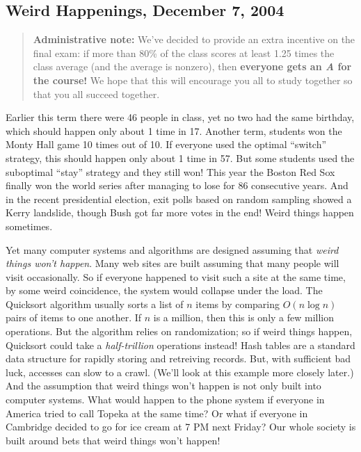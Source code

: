 \begin{editingnotes}

\section*{Weird Happenings, December 7, 2004}

\begin{quotation}
\noindent \textbf{Administrative note:} We've decided to provide an
extra incentive on the final exam: if more than 80\% of the class
scores at least 1.25 times the class average (and the average is
nonzero), then \textbf{everyone gets an \textit{A} for the course!}
We hope that this will encourage you all to study together so that you
all succeed together.
\end{quotation}


Earlier this term there were 46 people in class, yet no two had the
same birthday, which should happen only about 1 time in 17.  Another
term, students won the Monty Hall game 10 times out of 10.  If
everyone used the optimal ``switch'' strategy, this should happen only
about 1 time in 57.  But some students used the suboptimal ``stay''
strategy and they still won!  This year the Boston Red Sox finally won
the world series after managing to lose for 86 consecutive years.  And
in the recent presidential election, exit polls based on random
sampling showed a Kerry landslide, though Bush got far more votes in
the end!  Weird things happen sometimes.

Yet many computer systems and algorithms are designed assuming that
\textit{weird things won't happen}.  Many web sites are built assuming
that many people will visit occasionally.  So if everyone happened to
visit such a site at the same time, by some weird coincidence, the
system would collapse under the load.  The Quicksort algorithm usually
sorts a list of $n$ items by comparing $O(n \log n)$ pairs of items to
one another.  If $n$ is a million, then this is only a few million
operations.  But the algorithm relies on randomization; so if weird
things happen, Quicksort could take a \textit{half-trillion}
operations instead!  Hash tables are a standard data structure for
rapidly storing and retreiving records.  But, with sufficient bad
luck, accesses can slow to a crawl.  (We'll look at this example more
closely later.)  And the assumption that weird things won't happen is
not only built into computer systems.  What would happen to the phone
system if everyone in America tried to call Topeka at the same time?
Or what if everyone in Cambridge decided to go for ice cream at 7 PM
next Friday?  Our whole society is built around bets that weird things
won't happen!


\end{editingnotes}
